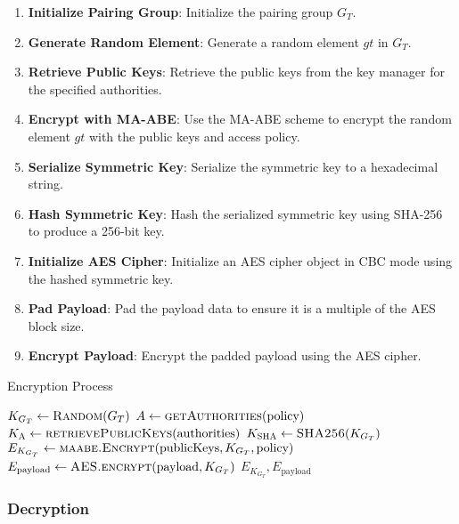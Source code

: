 \documentclass[cic,tc,english]{iiufrgs}
\begin{document}
    \begin{enumerate}
        \item \textbf{Initialize Pairing Group}: Initialize the pairing group \(G_T\).
        \item \textbf{Generate Random Element}: Generate a random element \(gt\) in \(G_T\).
        \item \textbf{Retrieve Public Keys}: Retrieve the public keys from the key manager for the specified authorities.
        \item \textbf{Encrypt with MA-ABE}: Use the MA-ABE scheme to encrypt the random element \(gt\) with the public keys and access policy.
        \item \textbf{Serialize Symmetric Key}: Serialize the symmetric key to a hexadecimal string.
        \item \textbf{Hash Symmetric Key}: Hash the serialized symmetric key using SHA-256 to produce a 256-bit key.
        \item \textbf{Initialize AES Cipher}: Initialize an AES cipher object in CBC mode using the hashed symmetric key.
        \item \textbf{Pad Payload}: Pad the payload data to ensure it is a multiple of the AES block size.
        \item \textbf{Encrypt Payload}: Encrypt the padded payload using the AES cipher.
    \end{enumerate}

    \begin{algorithm}
        \caption{Encryption Process}
        \label{alg:encryption_process}
        \scriptsize
        \begin{algorithmic}[1]
            \State $K_{G_T} \gets \textsc{Random}(G_T)$
            \State $A \gets \textsc{getAuthorities}(\text{policy})$
            \State $K_{\textsc{A}} \gets \textsc{retrievePublicKeys}(\text{authorities})$
            \State $K_{\textsc{SHA}} \gets \textsc{SHA256}(K_{G_T})$
            \State $E_{K_{G_T}} \gets \textsc{maabe.Encrypt}(\text{publicKeys}, K_{G_T}, \text{policy})$
            \State $E_{\text{payload}} \gets \textsc{AES.encrypt}(\text{payload}, K_{G_T})$
            \State \Return $E_{K_{G_T}}, E_{\text{payload}}$
        \EndProcedure
        \end{algorithmic}
    \end{algorithm}


    \subsubsection{Decryption}
\end{document}
